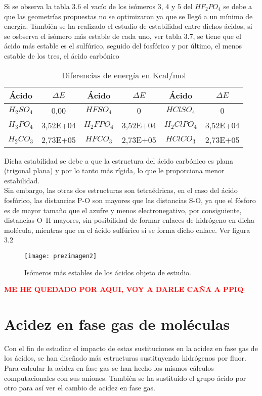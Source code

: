 Si se observa la tabla 3.6 el vacío de los isómeros 3, 4 y 5 del $HF_2PO_4$ se debe a que las geometrías propuestas no se optimizaron ya que se llegó a un mínimo de energía.
\newpage
También se ha realizado el estudio de estabilidad entre dichos ácidos, si se osbserva el isómero más estable de cada uno, ver tabla 3.7, se tiene que el ácido más estable es el sulfúrico, seguido del fosfórico y por último, el menos estable de los tres, el ácido carbónico \\

\begin{table}[H]
	\centering
	\begin{tabular}{|c|c|c|c|c|c|}
		\hline
Ácido&$\Delta E$&Ácido&$\Delta E$& Ácido&$\Delta E$\\ \hline
$H_2SO_4$&0,00&$HFSO_4$&0&$HClSO_4$&0\\ \hline
$H_3PO_4$&3,52E+04&$H_2FPO_4$&3,52E+04&$H_2ClPO_4$&3,52E+04\\ \hline
$H_2CO_3$&2,73E+05&$HFCO_3$&2,73E+05&$HClCO_3$&2,73E+05\\ \hline
	\end{tabular}
	\caption{Diferencias de energía en Kcal/mol}
\end{table}
Dicha estabilidad se debe a que la estructura del ácido carbónico es plana (trigonal plana) y por lo tanto más rígida, lo que le proporciona menor estabilidad.\\ Sin embargo, las otras dos estructuras son tetraédricas, en el caso del ácido fosfórico, las distancias P-O son mayores que las distancias S-O, ya que el fósforo es de mayor tamaño que el azufre y menos electronegativo, por consiguiente, distancias O--H mayores, sin posibilidad de formar enlaces de hidrógeno en dicha molécula, mientras que en el ácido sulfúrico si se forma dicho enlace. Ver figura 3.2
\begin{figure}[H]
	\centering
	\texttt{[image: prezimagen2]}
	\caption{Isómeros más estables  de los ácidos objeto de estudio.}
\end{figure}
{\bfseries\textcolor{red}{ME HE QUEDADO POR AQUI, VOY A DARLE CAÑA A PPIQ}}
\section{Acidez en fase gas de moléculas}

Con el fin de estudiar el impacto de estas sustituciones en la acidez en fase gas de los ácidos, se han diseñado más estructuras sustituyendo hidrógenos por fluor. Para calcular la acidez en fase gas se han hecho los mismos cálculos computacionales con sus aniones.
También se ha sustituido el grupo ácido por otro para así ver el cambio de acidez en fase gas.

